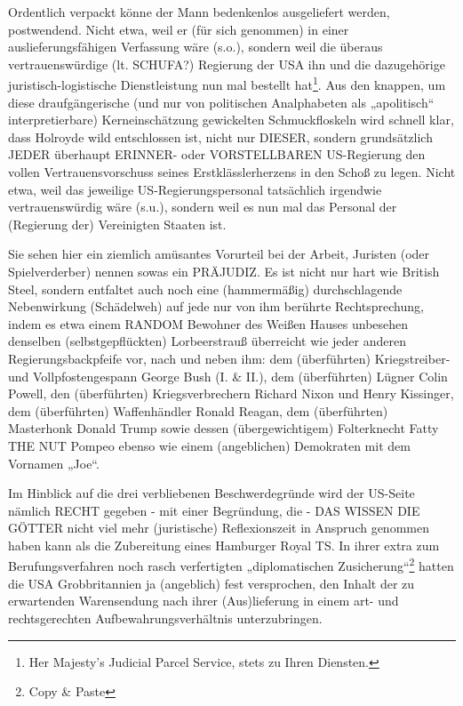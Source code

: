 \begin{multicols}{2}
Ordentlich verpackt könne der Mann bedenkenlos ausgeliefert werden, postwendend. Nicht etwa, weil er (für
sich genommen) in einer auslieferungsfähigen Verfassung wäre (s.o.), sondern weil die überaus vertrauenswürdige (lt. SCHUFA?) Regierung der USA ihn und die
dazugehörige juristisch-logistische Dienstleistung nun
mal bestellt hat\footnote[29]{Her Majesty’s Judicial Parcel Service, stets zu Ihren Diensten.}. 
Aus den knappen, um diese draufgängerische (und nur von politischen Analphabeten
als „apolitisch“ interpretierbare) Kerneinschätzung gewickelten Schmuckfloskeln wird schnell klar, dass Holroyde wild entschlossen ist, nicht nur DIESER, sondern
grundsätzlich JEDER überhaupt ERINNER- oder VORSTELLBAREN US-Regierung den vollen Vertrauensvorschuss seines Erstklässlerherzens in den Schoß zu legen.
Nicht etwa, weil das jeweilige US-Regierungspersonal
tatsächlich irgendwie vertrauenswürdig wäre (s.u.), sondern weil es nun mal das Personal der (Regierung der)
Vereinigten Staaten ist.

Sie sehen hier ein ziemlich amüsantes Vorurteil bei der
Arbeit, Juristen (oder Spielverderber) nennen sowas ein
PRÄJUDIZ. Es ist nicht nur hart wie British Steel, sondern
entfaltet auch noch eine (hammermäßig) durchschlagende Nebenwirkung (Schädelweh) auf jede nur von ihm
berührte Rechtsprechung, indem es etwa einem RANDOM Bewohner des Weißen Hauses unbesehen denselben (selbstgepflückten) Lorbeerstrauß überreicht wie jeder anderen Regierungsbackpfeife vor, nach und neben
ihm: dem (überführten) Kriegstreiber- und Vollpfostengespann George Bush (I. \& II.), dem (überführten) Lügner Colin Powell, den (überführten) Kriegsverbrechern
Richard Nixon und Henry Kissinger, dem (überführten)
Waffenhändler Ronald Reagan, dem (überführten) Masterhonk Donald Trump sowie dessen (übergewichtigem)
Folterknecht Fatty THE NUT Pompeo ebenso wie einem
(angeblichen) Demokraten mit dem Vornamen „Joe“.

Im Hinblick auf die drei verbliebenen Beschwerdegründe wird der US-Seite nämlich RECHT gegeben - mit
einer Begründung, die - DAS WISSEN DIE GÖTTER nicht viel mehr (juristische) Reflexionszeit in Anspruch
genommen haben kann als die Zubereitung eines Hamburger Royal TS. In ihrer extra zum Berufungsverfahren noch rasch verfertigten 
„diplomatischen Zusicherung“\footnote[30]{Copy \& Paste}
hatten die USA Grobbritannien ja (angeblich) fest versprochen, den Inhalt der zu erwartenden Warensendung
nach ihrer (Aus)lieferung in einem art- und rechtsgerechten Aufbewahrungsverhältnis unterzubringen.


\end{multicols}
